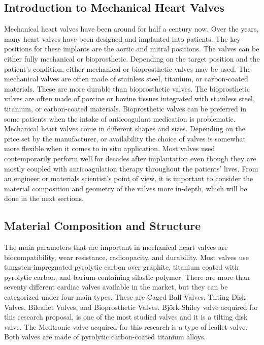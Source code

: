 \subsection*{Introduction to Mechanical Heart Valves}
Mechanical heart valves have been around for half a century now. Over the years, many heart valves have been designed and implanted into patients. The key positions for these implants are the aortic and mitral positions.\cite*{hutchison2011} The valves can be either fully mechanical or bioprosthetic. Depending on the target position and the patient's condition, either mechanical or bioprosthetic valves may be used. The mechanical valves are often made of stainless steel, titanium, or carbon-coated materials. These are more durable than bioprosthetic valves. The bioprosthetic valves are often made of porcine or bovine tissues integrated with stainless steel, titanium, or carbon-coated materials.\cite*{venkatesh2013} Bioprosthetic valves can be preferred in some patients when the intake of anticoagulant medication is problematic.
\\Mechanical heart valves come in different shapes and sizes. Depending on the price set by the manufacturer, or availability the choice of valves is somewhat more flexible when it comes to in situ application. Most valves used contemporarily perform well for decades after implantation even though they are mostly coupled with anticoagulation therapy throughout the patients' lives. From an engineer or materials scientist's point of view, it is important to consider the material composition and geometry of the valves more in-depth, which will be done in the next sections.\\
\subsection*{Material Composition and Structure}
The main parameters that are important in mechanical heart valves are biocompatibility, wear resistance, radioopacity, and durability. Most valves use tungsten-impregnated pyrolytic carbon over graphite, titanium coated with pyrolytic carbon, and barium-containing silastic polymer.\cite*{hutchison2011} There are more than seventy different cardiac valves available in the market, but they can be categorized under four main types. These are Caged Ball Valves, Tilting Disk Valves, Bileaflet Valves, and Bioprosthetic Valves.\cite*{venkatesh2013} Björk-Shiley valve acquired for this research proposal, is one of the most studied valves and it is a tilting disk valve. The Medtronic valve acquired for this research is a type of leaflet valve. Both valves are made of pyrolytic carbon-coated titanium alloys.

